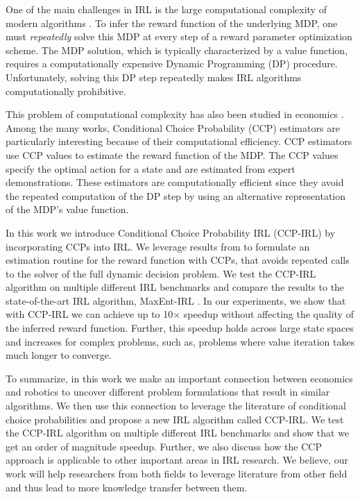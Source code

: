 \documentclass{article}
\begin{document}
One of the main challenges in IRL is the large computational complexity of modern algorithms \cite{ziebart, Ratliff2006}. To infer the reward function of the underlying MDP, one must \textit{repeatedly} solve this MDP at every step of a reward parameter optimization scheme. The MDP solution, which is typically characterized by a value function, requires a computationally expensive Dynamic Programming (DP) procedure. Unfortunately, solving this DP step repeatedly makes IRL algorithms computationally prohibitive.  

This problem of computational complexity has also been studied in economics \cite{hotz, su2012constrained, aguirregabiria2002swapping}. Among the many works, Conditional Choice Probability (CCP) estimators \cite{hotz} are particularly interesting because of their computational efficiency.
CCP estimators use CCP values to estimate the reward function of the MDP.
The CCP values specify the optimal action for a state and are estimated from expert demonstrations. These estimators are computationally efficient since they avoid the repeated computation of the DP step by using an alternative representation of the MDP's value function.

In this work we introduce Conditional Choice Probability IRL (CCP-IRL) by incorporating CCPs into IRL. We leverage results from \cite{rust_gmc, hotz, magnac} to formulate an estimation routine for the reward function with CCPs, that avoids repeated calls to the solver of the full dynamic decision problem. We test the CCP-IRL algorithm on multiple different IRL benchmarks and compare the results to the state-of-the-art IRL algorithm, MaxEnt-IRL \cite{ziebart}. In our experiments, we show that with CCP-IRL we can achieve up to 10$\times$ speedup without affecting the quality of the inferred reward function. Further, this speedup holds across large state spaces and increases for complex problems, such as, problems where value iteration takes much longer to converge. 


To summarize, in this work we make an important connection between economics and robotics to uncover different problem formulations that result in similar algorithms. We then use this connection to leverage the literature of conditional choice probabilities and propose a new IRL algorithm called CCP-IRL. We test the CCP-IRL algorithm on multiple different IRL benchmarks and show that we get an order of magnitude speedup. Further, we also discuss how the CCP approach is applicable to other important areas in IRL research. We believe, our work will help researchers from both fields to leverage literature from other field and thus lead to more knowledge transfer between them.
\end{document}
